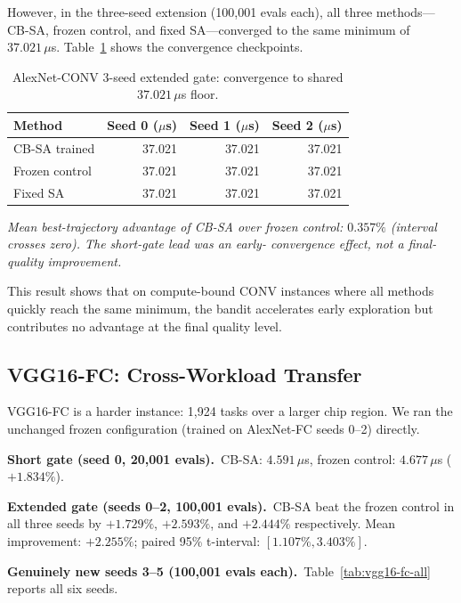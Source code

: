 \documentclass[10pt,conference]{IEEEtran}
\begin{document}
However, in the three-seed extension (100,001 evals each), all three methods---
CB-SA, frozen control, and fixed SA---converged to the same minimum of
$37.021\,\mu$s.  Table~\ref{tab:conv-seeds} shows the convergence checkpoints.

\begin{table}[htbp]
  \caption{AlexNet-CONV 3-seed extended gate: convergence to shared
           $37.021\,\mu$s floor.}
  \label{tab:conv-seeds}
  \centering
  \begin{tabular}{lrrr}
    \toprule
    Method & Seed 0 ($\mu$s) & Seed 1 ($\mu$s) & Seed 2 ($\mu$s) \\
    \midrule
    CB-SA trained    & 37.021 & 37.021 & 37.021 \\
    Frozen control   & 37.021 & 37.021 & 37.021 \\
    Fixed SA         & 37.021 & 37.021 & 37.021 \\
    \bottomrule
  \end{tabular}
  \vspace{0.5ex}
  \small{\textit{Mean best-trajectory advantage of CB-SA over frozen control:
  $0.357\%$ (interval crosses zero).  The short-gate lead was an early-
  convergence effect, not a final-quality improvement.}}
\end{table}

This result shows that on compute-bound CONV instances where all methods
quickly reach the same minimum, the bandit accelerates early exploration but
contributes no advantage at the final quality level.

\subsection{VGG16-FC: Cross-Workload Transfer}

VGG16-FC is a harder instance: 1,924 tasks over a larger chip region.  We ran
the unchanged frozen configuration (trained on AlexNet-FC seeds 0--2) directly.

\textbf{Short gate (seed 0, 20,001 evals).}\
CB-SA: $4.591\,\mu$s, frozen control: $4.677\,\mu$s ($+1.834\%$).

\textbf{Extended gate (seeds 0--2, 100,001 evals).}\
CB-SA beat the frozen control in all three seeds by $+1.729\%$, $+2.593\%$,
and $+2.444\%$ respectively.  Mean improvement: $+2.255\%$; paired 95\%
t-interval: $[1.107\%, 3.403\%]$.

\textbf{Genuinely new seeds 3--5 (100,001 evals each).}\
Table~\ref{tab:vgg16-fc-all} reports all six seeds.
\end{document}
